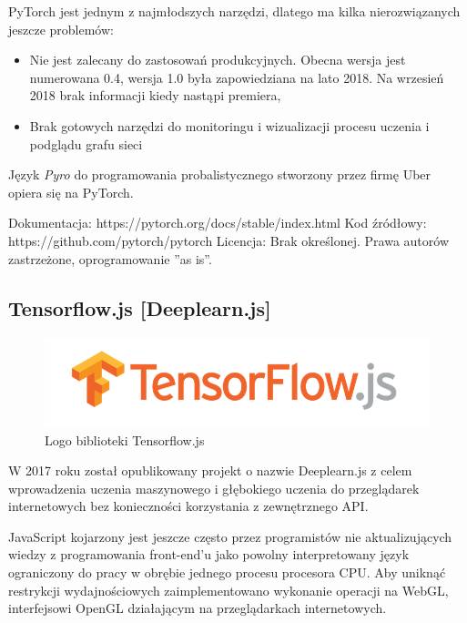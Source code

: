 \documentclass[12pt,a4paper,twoside,titlepage,openright]{book}
\begin{document}
PyTorch jest jednym z najmłodszych narzędzi, dlatego ma kilka nierozwiązanych jeszcze problemów:
\begin{itemize}
\item Nie jest zalecany do zastosowań produkcyjnych. Obecna wersja jest numerowana 0.4, wersja 1.0 była zapowiedziana na lato 2018. Na wrzesień 2018 brak informacji kiedy nastąpi premiera,
\item Brak gotowych narzędzi do monitoringu i wizualizacji procesu uczenia i podglądu grafu sieci
\end{itemize}\cite{book:2226069}

Język \textit{Pyro} do programowania probalistycznego stworzony przez firmę Uber opiera się na PyTorch.

\noindent
\newline
Dokumentacja: https://pytorch.org/docs/stable/index.html
\newline
Kod źródłowy: https://github.com/pytorch/pytorch
\newline
Licencja: Brak określonej. Prawa autorów zastrzeżone, oprogramowanie ''as is''.


\subsection{Tensorflow.js [Deeplearn.js]}
\begin{figure}[ht]
	\centering
			\includegraphics[resolution=100, scale=0.6]{TensorflowJS.png}
		\caption{Logo biblioteki Tensorflow.js}
\end{figure}

W 2017 roku został opublikowany projekt o nazwie Deeplearn.js z celem wprowadzenia uczenia maszynowego i głębokiego uczenia do przeglądarek internetowych bez konieczności korzystania z zewnętrznego API.

JavaScript kojarzony jest jeszcze często przez programistów nie aktualizujących wiedzy z programowania front-end'u jako powolny interpretowany język ograniczony do pracy w obrębie jednego procesu procesora CPU. \cite{siteSlowJavaScript} Aby uniknąć restrykcji wydajnościowych zaimplementowano wykonanie operacji na WebGL, interfejsowi OpenGL działającym na przeglądarkach internetowych.
\end{document}
